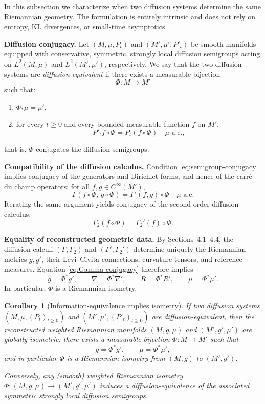 \documentclass[11pt]{amsart}
\newtheorem{corollary}[theorem]{Corollary}
\theoremstyle{definition}
\theoremstyle{remark}
\begin{document}
In this subsection we characterize when two diffusion systems determine the same
Riemannian geometry.
The formulation is entirely intrinsic and does not rely on entropy, KL divergences,
or small-time asymptotics.

\medskip
\noindent\textbf{Diffusion conjugacy.}
Let $(M,\mu,P_t)$ and $(M',\mu',P'_t)$ be smooth manifolds equipped with conservative,
symmetric, strongly local diffusion semigroups acting on $L^2(M,\mu)$ and $L^2(M',\mu')$,
respectively.
We say that the two diffusion systems are \emph{diffusion-equivalent} if there exists
a measurable bijection
\[
\Phi : M \longrightarrow M'
\]
such that:
\begin{enumerate}
\item[(i)] $\Phi_*\mu = \mu'$,
\item[(ii)] for every $t\ge0$ and every bounded measurable function $f$ on $M'$,
\begin{equation}\label{eq:semigroup-conjugacy}
P'_t f \circ \Phi = P_t(f\circ\Phi)
\quad \mu\text{-a.e.},
\end{equation}
\end{enumerate}
that is, $\Phi$ conjugates the diffusion semigroups.

\medskip
\noindent\textbf{Compatibility of the diffusion calculus.}
Condition \eqref{eq:semigroup-conjugacy} implies conjugacy of the generators and
Dirichlet forms, and hence of the carré du champ operators:
for all $f,g\in C^\infty(M')$,
\begin{equation}\label{eq:Gamma-conjugacy}
\Gamma(f\circ\Phi,\,g\circ\Phi)
=
\Gamma'(f,g)\circ\Phi
\quad \mu\text{-a.e.}
\end{equation}
Iterating the same argument yields conjugacy of the second-order diffusion calculus:
\[
\Gamma_2(f\circ\Phi)
=
\Gamma_2'(f)\circ\Phi.
\]

\medskip
\noindent\textbf{Equality of reconstructed geometric data.}
By Sections~4.1--4.4, the diffusion calculi $(\Gamma,\Gamma_2)$ and
$(\Gamma',\Gamma_2')$ determine uniquely the Riemannian metrics $g,g'$,
their Levi--Civita connections, curvature tensors, and reference measures.
Equation \eqref{eq:Gamma-conjugacy} therefore implies
\[
g = \Phi^* g',
\qquad
\nabla = \Phi^* \nabla',
\qquad
R = \Phi^* R',
\qquad
\mu = \Phi^* \mu'.
\]
In particular, $\Phi$ is a Riemannian isometry.

\begin{corollary}[Information-equivalence implies isometry]\label{cor:4.11}
If two diffusion systems $(M,\mu,(P_t)_{t\ge0})$ and $(M',\mu',(P'_t)_{t\ge0})$ are diffusion-equivalent,
then the reconstructed weighted Riemannian manifolds $(M,g,\mu)$ and $(M',g',\mu')$ are globally isometric:
there exists a measurable bijection $\Phi:M\to M'$ such that
\[
g=\Phi^*g',
\qquad
\mu=\Phi^*\mu',
\]
and in particular $\Phi$ is a Riemannian isometry from $(M,g)$ to $(M',g')$.

Conversely, any (smooth) weighted Riemannian isometry $\Phi:(M,g,\mu)\to(M',g',\mu')$ induces a diffusion-equivalence
of the associated symmetric strongly local diffusion semigroups.
\end{corollary}
\end{document}
